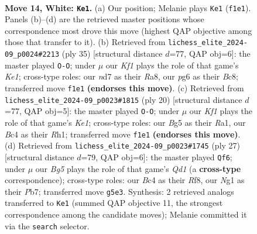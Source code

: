 \documentclass[11pt]{article}
\begin{document}
\clearpage

\begin{figure}[p]\centering
\begin{subfigure}{0.46\textwidth}\centering
\resizebox{\linewidth}{!}{%
\newchessgame
\chessboard[
  setfen={r1b1r1k1/ppqn1pbp/6p1/2pPp1B1/2B1P3/2P5/P4PPP/R1Q2KNR w - - 4 14},
  showmover=false,
  pgfstyle=straightmove, color=movearrow, markmove={f1-e1}
]}
\caption{}
\end{subfigure}\hfill
\begin{subfigure}{0.46\textwidth}\centering
\resizebox{\linewidth}{!}{%
\newchessgame
\chessboard[
  setfen={r1bqk2r/pp1p2p1/2p5/8/2Pb1Pp1/2N3Pp/PPQPP2P/R1BK3R b kq - 1 18},
  showmover=false,
  pgfstyle=straightmove, color=movearrow, markmove={e8-g8}
]}
\caption{}
\end{subfigure}
\\[4pt]
\begin{subfigure}{0.46\textwidth}\centering
\resizebox{\linewidth}{!}{%
\newchessgame
\chessboard[
  setfen={r1bq1rk1/4ppbp/2p2np1/p2p4/P7/1P2P3/1BPNBPPP/R2QK2R w KQ - 0 11},
  showmover=false,
  pgfstyle=straightmove, color=movearrow, markmove={e1-g1}
]}
\caption{}
\end{subfigure}\hfill
\begin{subfigure}{0.46\textwidth}\centering
\resizebox{\linewidth}{!}{%
\newchessgame
\chessboard[
  setfen={r2q1rk1/1pp2pbp/4b3/p3p2p/P3P3/2P1N3/1PQ2PPP/R1B2RK1 b - - 1 14},
  showmover=false,
  pgfstyle=straightmove, color=movearrow, markmove={d8-f6}
]}
\caption{}
\end{subfigure}
\caption{\textbf{Move 14, White: \texttt{Ke1}.} (a) Our position; Melanie plays \texttt{Ke1} (\texttt{f1e1}). Panels (b)--(d) are the retrieved master positions whose correspondence most drove this move (highest QAP objective among those that transfer to it). (b) Retrieved from \texttt{lichess\_elite\_2024-09\_p0024\#2213} (ply 35) [structural distance $d$=77, QAP obj=6]: the master played \texttt{O-O}; under $\mu$ our \emph{Kf1} plays the role of that game's \emph{Ke1}; cross-type roles: our \emph{n}d7 as their \emph{R}a8, our \emph{p}g6 as their \emph{B}c8; transferred move \texttt{f1e1} \textbf{(endorses this move)}. (c) Retrieved from \texttt{lichess\_elite\_2024-09\_p0023\#1815} (ply 20) [structural distance $d$=77, QAP obj=5]: the master played \texttt{O-O}; under $\mu$ our \emph{Kf1} plays the role of that game's \emph{Ke1}; cross-type roles: our \emph{B}g5 as their \emph{R}a1, our \emph{B}c4 as their \emph{R}h1; transferred move \texttt{f1e1} \textbf{(endorses this move)}. (d) Retrieved from \texttt{lichess\_elite\_2024-09\_p0023\#1745} (ply 27) [structural distance $d$=79, QAP obj=6]: the master played \texttt{Qf6}; under $\mu$ our \emph{Bg5} plays the role of that game's \emph{Qd1} (a \textbf{cross-type} correspondence); cross-type roles: our \emph{B}c4 as their \emph{R}f8, our \emph{N}g1 as their \emph{P}b7; transferred move \texttt{g5e3}. Synthesis: 2 retrieved analogs transferred to \texttt{Ke1} (summed QAP objective 11, the strongest correspondence among the candidate moves); Melanie committed it via the \texttt{search} selector.}
\label{fig:thought-m26}
\end{figure}
\end{document}
